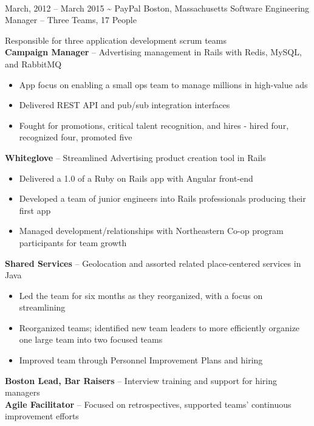 \documentclass[]{friggeri-cv}
\begin{document}
\begin{entrylist}
  \\[0.8cm]%
  \entryalt
    {March, 2012 -- March 2015}
    {\textbf{\textasciitilde} PayPal}
    {Boston, Massachusetts}
    {Software Engineering Manager -- Three Teams, 17 People}
    {Responsible for three application development scrum teams \\
      \textbf{Campaign Manager} -- Advertising management in Rails with Redis, MySQL,
      and RabbitMQ
    \begin{itemize}
      \item App focus on enabling a small ops team to manage millions in
        high-value ads
      \item Delivered REST API and pub/sub integration interfaces
      \item Fought for promotions, critical talent recognition, and hires - hired four, recognized four, promoted five
    \end{itemize}
      \textbf{Whiteglove} -- Streamlined Advertising product creation tool in Rails 
    \begin{itemize}
      \item Delivered a 1.0 of a Ruby on Rails app with Angular front-end
      \item Developed a team of junior engineers into Rails professionals producing their first app
      \item Managed development/relationships with Northeastern Co-op program
        participants for team growth
    \end{itemize} 
      \textbf{Shared Services} -- Geolocation and assorted related place-centered
      services in Java
    \begin{itemize}
      \item Led the team for six months as they reorganized, with a focus on
        streamlining
      \item Reorganized teams; identified new team leaders to more efficiently organize one large team into two focused teams
      \item Improved team through Personnel Improvement Plans and hiring
    \end{itemize}
    \textbf{Boston Lead, Bar Raisers} -- Interview training and support for hiring managers\\
    \textbf{Agile Facilitator} -- Focused on retrospectives, supported teams' continuous improvement efforts}


\end{entrylist}
\end{document}
